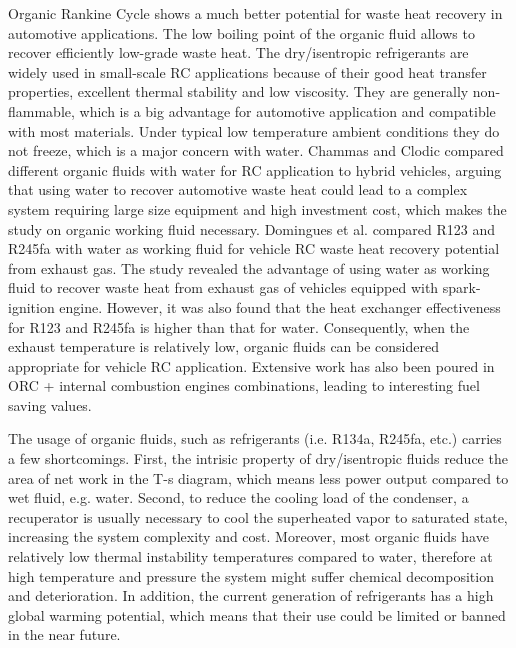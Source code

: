 Organic Rankine Cycle shows a much better potential for waste heat recovery in automotive applications. The low boiling point of the organic fluid allows to recover efficiently low-grade waste heat. The dry/isentropic refrigerants are widely used in small-scale RC applications because of their good heat transfer properties, excellent thermal stability and low viscosity. They are generally non-flammable, which is a big advantage for automotive application and compatible with most materials. Under typical low temperature ambient conditions they do not freeze, which is a major concern with water. Chammas and Clodic \cite{ElChammas2005} compared different organic fluids with water for RC application to hybrid vehicles, arguing that using water to recover automotive waste heat could lead to a complex system requiring large size equipment and high investment cost, which makes the study on organic working fluid necessary. Domingues et al. \cite{Domingues2012} compared R123 and R245fa with water as working fluid for vehicle RC waste heat recovery potential from exhaust gas. The study revealed the advantage of using water as working fluid to recover waste heat from exhaust gas of vehicles equipped with spark-ignition engine. However, it was also found that the heat exchanger effectiveness for R123 and R245fa is higher than that for water. Consequently, when the exhaust temperature is relatively low, organic fluids can be considered appropriate for vehicle RC application. Extensive work has also been poured in ORC + internal combustion engines combinations, leading to interesting fuel saving values.

The usage of organic fluids, such as refrigerants (i.e. R134a, R245fa, etc.) carries a few shortcomings. First, the intrisic property of dry/isentropic fluids reduce the area of net work in the T-s diagram, which means less power output compared to wet fluid, e.g. water. Second, to reduce the cooling load of the condenser, a recuperator is usually necessary to cool the superheated vapor to saturated state, increasing the system complexity and cost. Moreover, most organic fluids have relatively low thermal instability temperatures compared to water, therefore at high temperature and pressure the system might suffer chemical decomposition and deterioration. In addition, the current generation of refrigerants has a high global warming potential, which means that their use could be limited or banned in the near future.

